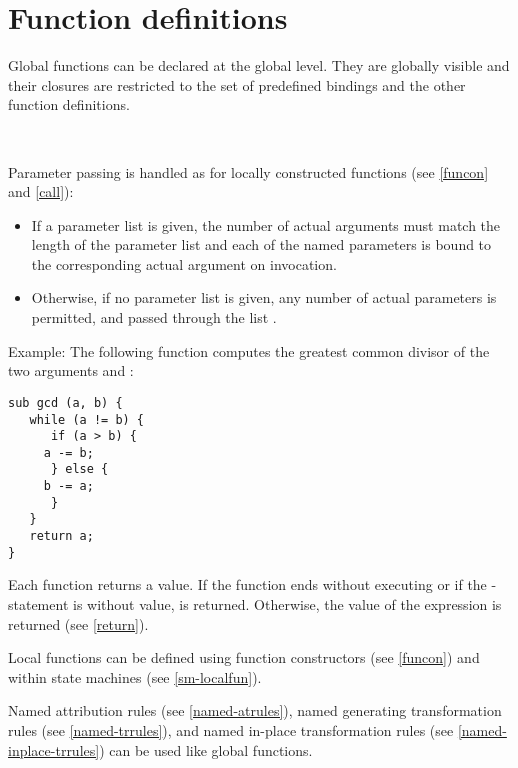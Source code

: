 \chapter{Function definitions}\label{functiondef}

Global functions can be declared at the global level. They are
globally visible and their closures are restricted
to the set of predefined bindings and the other function definitions.

\begin{grammar}
      \produces {}   \\
      \produces {} 
	  
\end{grammar}

\noindent
Parameter passing is handled as for locally constructed functions
(see \ref{funcon} and \ref{call}):

\begin{itemize}
   \item If a parameter list is given, the number of actual
      arguments must match the length of the parameter list
      and each of the named parameters is bound to the corresponding
      actual argument on invocation.
   \item Otherwise, if no parameter list is given, any number
      of actual parameters is permitted, and passed through
      the list .
\end{itemize}

Example: The following function computes the greatest common divisor
of the two arguments  and :

\begin{lstlisting}
sub gcd (a, b) {
   while (a != b) {
      if (a > b) {
	 a -= b;
      } else {
	 b -= a;
      }
   }
   return a;
}
\end{lstlisting}

Each function returns a value. If the function ends without
executing  or if the -statement
is without value,  is returned. Otherwise, the
value of the  expression is returned (see \ref{return}).

\noindent
Local functions can be defined using function constructors
(see \ref{funcon}) and within state machines (see \ref{sm-localfun}).

Named attribution rules (see \ref{named-atrules}),
named generating transformation rules (see \ref{named-trrules}),
and named in-place transformation rules (see \ref{named-inplace-trrules}) can be
used like global functions.

\endinput
